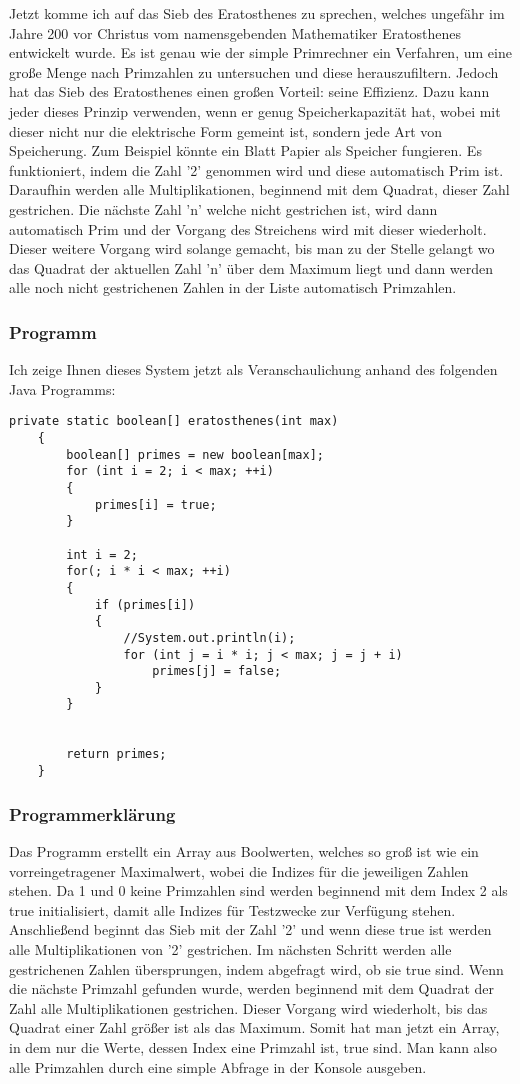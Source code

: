 Jetzt komme ich auf das Sieb des Eratosthenes zu sprechen, welches ungefähr im Jahre 200 vor Christus vom namensgebenden Mathematiker Eratosthenes entwickelt wurde. Es ist genau wie der simple Primrechner ein Verfahren, um eine große Menge nach Primzahlen zu untersuchen und diese herauszufiltern. Jedoch hat das Sieb des Eratosthenes einen großen Vorteil: seine Effizienz. Dazu kann jeder dieses Prinzip verwenden, wenn er genug Speicherkapazität hat, wobei mit dieser nicht nur die elektrische Form gemeint ist, sondern jede Art von Speicherung. Zum Beispiel könnte ein Blatt Papier als Speicher fungieren. Es funktioniert, indem die Zahl '2' genommen wird und diese automatisch Prim ist. Daraufhin werden alle Multiplikationen, beginnend mit dem Quadrat, dieser Zahl gestrichen. Die nächste Zahl 'n' welche nicht gestrichen ist, wird dann automatisch Prim und der Vorgang des Streichens wird mit dieser wiederholt. Dieser weitere Vorgang wird solange gemacht, bis man zu der Stelle gelangt wo das Quadrat der aktuellen Zahl 'n' über dem Maximum liegt und dann werden alle noch nicht gestrichenen Zahlen in der Liste automatisch Primzahlen.
\subsubsection{Programm}
Ich zeige Ihnen dieses System jetzt als Veranschaulichung anhand des folgenden Java Programms:
\lstset{language=Java}
\begin{lstlisting}[frame=single]
  private static boolean[] eratosthenes(int max)
	{
		boolean[] primes = new boolean[max];
		for (int i = 2; i < max; ++i)
		{
			primes[i] = true;
		}
		
		int i = 2;
		for(; i * i < max; ++i)
		{
			if (primes[i])
			{
				//System.out.println(i);
				for (int j = i * i; j < max; j = j + i)
					primes[j] = false;
			}
		}
		
		
		return primes;
	}
\end{lstlisting}
\newpage
\subsubsection{Programmerklärung}
Das Programm erstellt ein Array aus Boolwerten, welches so groß ist wie ein vorreingetragener Maximalwert, wobei die Indizes für die jeweiligen Zahlen stehen. Da 1 und 0 keine Primzahlen sind werden beginnend mit dem Index 2 als true initialisiert, damit alle Indizes für Testzwecke zur Verfügung stehen. Anschließend beginnt das Sieb mit der Zahl '2' und wenn diese true ist werden alle Multiplikationen von '2' gestrichen. Im nächsten Schritt werden alle gestrichenen Zahlen übersprungen, indem abgefragt wird, ob sie true sind. Wenn die nächste Primzahl gefunden wurde, werden beginnend mit dem Quadrat der Zahl alle Multiplikationen gestrichen. Dieser Vorgang wird wiederholt, bis das Quadrat einer Zahl größer ist als das Maximum. Somit hat man jetzt ein Array, in dem nur die Werte, dessen Index eine Primzahl ist, true sind. Man kann also alle Primzahlen durch eine simple Abfrage in der Konsole ausgeben.

